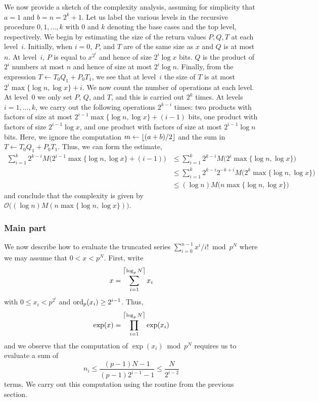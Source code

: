 We now provide a sketch of the complexity analysis, assuming for 
simplicity that $a = 1$ and $b = n = 2^k + 1$.  Let us label the various 
levels in the recursive procedure $0, 1, \dotsc, k$ with $0$ and $k$ 
denoting the base cases and the top level, respectively.  We begin 
by estimating the size of the return values $P, Q, T$ at each level~$i$. 
Initially, when $i = 0$, $P$, and $T$ are of the same size as $x$ 
and $Q$ is at most $n$.  At level~$i$, $P$ is equal to $x^{2^i}$ 
and hence of size $2^i \log x$ bits.  $Q$ is the product of 
$2^i$ numbers at most $n$ and hence of size at most $2^i \log n$. 
Finally, from the expression $T \gets T_0 Q_1 + P_0 T_1$, we see 
that at level~$i$ the size of $T$ is at most 
$2^i \max \{\log n, \log x\} + i$. 
We now count the number of operations at each level.  At level~$0$ 
we only set $P$, $Q$, and $T$, and this is carried out $2^k$ times. 
At levels $i = 1, \dotsc, k$, we carry out the following operations 
$2^{k-i}$ times:  two products with factors of size at most 
$2^{i-1} \max\{ \log n, \log x \} + (i-1)$ bits, one product with 
factors of size $2^{i-1} \log x$, and one product with factors of 
size at most $2^{i-1} \log n$ bits.  Here, we ignore the computation 
$m \gets \left\lfloor(a+b)/2\right\rfloor$ and the sum in $T \gets T_0 Q_1 + P_0 T_1$. 
Thus, we can form the estimate,
\begin{align*}
\sum_{i=1}^k 2^{k-i} M \bigl( 2^{i-1} \max\{ \log n, \log x \} 
                             + (i - 1)\bigr) 
& \leq \sum_{i=1}^k 2^{k-i} M \bigl( 2^{i} \max\{ \log n, \log x \} \bigr) \\
& \leq \sum_{i=1}^k 2^{k-i} 2^{-k+i} M \bigl( 2^{k} \max\{ \log n, \log x \} \bigr) \\
& \leq (\log n) M \bigl( n \max\{ \log n, \log x \} \bigr)
\end{align*}
and conclude that the complexity is given by 
$\mathcal{O}\bigl((\log n) M(n \max\{ \log n, \log x\})\bigr)$.

\subsubsection{Main part}

We now describe how to evaluate the truncated series 
$\sum_{i=0}^{n-1} x^i / i! \bmod{p^N}$ where we may assume 
that $0 < x < p^N$.  First, write 
\begin{equation}
x = \sum_{i=1}^{\left\lceil\log_p N\right\rceil} x_i
\end{equation}
with $0 \leq x_i < p^{2^i}$ and $\operatorname{ord}_p(x_i) \geq 2^{i-1}$.  Thus, 
\begin{equation}
\exp (x) = \prod_{i=1}^{\left\lceil\log_p N\right\rceil} \exp(x_i)
\end{equation}
and we observe that the computation of $\exp(x_i) \bmod p^N$ requires 
us to evaluate a sum of 
\begin{equation}
n_i \leq \frac{(p-1) N - 1}{(p-1) 2^{i-1} - 1} \leq \frac{N}{2^{i-2}}
\end{equation}
terms.  We carry out this computation using the routine from the 
previous section.

